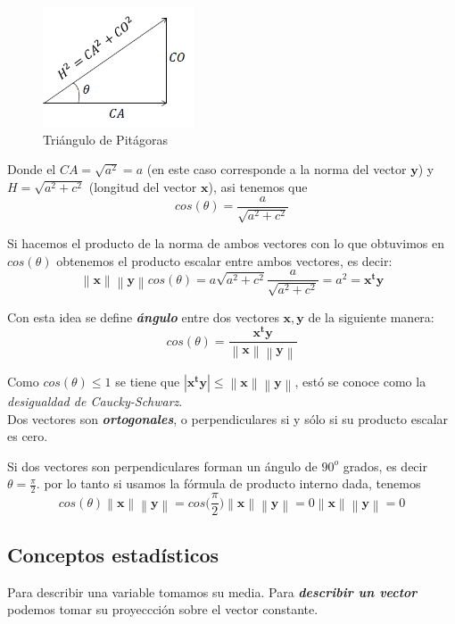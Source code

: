 \documentclass[12pt,letterpaper]{report} %
\begin{document}
\begin{figure}
	\caption{Triángulo de Pitágoras}
	\centering
	\includegraphics[width=0.4\textwidth]{img/triangulo1.png}
\end{figure}

Donde el $CA=\sqrt{a^2}=a$ (en este caso corresponde a la norma del vector $\mathbf{y}$) y $H=\sqrt{a^2+c^2}$ (longitud del vector $\mathbf{x}$), asi tenemos que
$$cos(\theta)=\frac{a}{\sqrt{a^2+c^2}}$$

Si hacemos el producto de la norma de ambos vectores con lo que obtuvimos en $cos(\theta)$ obtenemos el producto escalar entre ambos vectores, es decir:
$$\left\| \mathbf{x} \right\|\left\| \mathbf{y} \right\| cos(\theta)=a \sqrt{a^2+c^2}\frac{a}{\sqrt{a^2+c^2}}=a^2=\mathbf{x^ty}$$

Con esta idea se define \textit{\textbf{ángulo}} entre dos vectores $\mathbf{x},\mathbf{y}$ de la siguiente manera:
$$cos(\theta)=\frac{\mathbf{x^ty}}{\left\| \mathbf{x} \right\|\left\| \mathbf{y} \right\|}$$

Como $cos(\theta)\le 1$ se tiene que $|\mathbf{x^ty}| \le\left\| \mathbf{x} \right\|\left\| \mathbf{y} \right\|$, estó se conoce como la \textit{desigualdad de Caucky-Schwarz}. \\

Dos vectores son \textit{\textbf{ortogonales}}, o perpendiculares si y sólo si su producto escalar es cero.

Si dos vectores son perpendiculares forman un ángulo de $90^o$ grados, es decir $\theta=\frac{\pi}{2}$. por lo tanto si usamos la fórmula de producto interno dada, tenemos
$$cos(\theta)\left\| \mathbf{x} \right\|\left\| \mathbf{y} \right\|=cos\bigg(\frac{\pi}{2}\bigg)\left\| \mathbf{x} \right\|\left\| \mathbf{y} \right\|=0\left\| \mathbf{x} \right\|\left\| \mathbf{y} \right\|=0$$

\subsection{Conceptos estadísticos}

Para describir una variable tomamos su media. Para \textit{\textbf{describir un vector}} podemos tomar su proyeccción sobre el vector constante.
\end{document}
